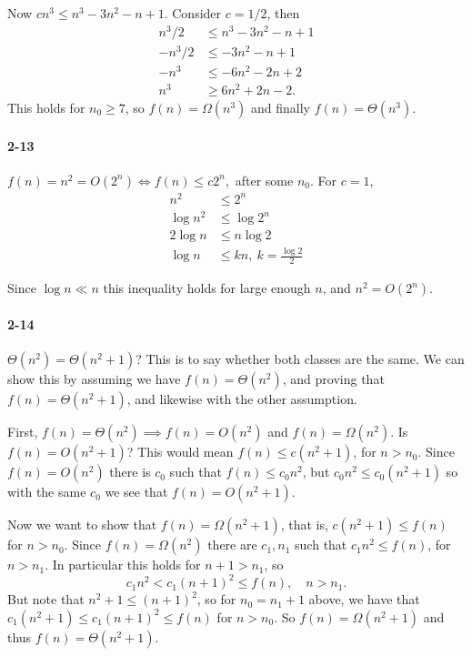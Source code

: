 \documentclass{report}
\begin{document}
Now $cn^3 \le n^3 - 3n^2 - n + 1.$ Consider $c = 1/2$, then
\begin{align*}
	n^3/2 &\le n^3 - 3n^2 - n + 1 \\
	-n^3/2 &\le -3n^2 - n + 1 \\
	-n^3 &\le -6n^2 - 2n + 2 \\
	n^3 &\ge 6n^2 + 2n - 2.
\end{align*}
This holds for $n_0 \ge 7$, so $f(n) = \Omega(n^3)$ and finally $f(n) = \Theta(n^3)$.

\paragraph{2-13}$f(n) = n^2 = O(2^n) \iff f(n) \le c2^n,$ after some $n_0$. For $c = 1$,
\begin{align*}
	n^2 &\le 2^n \\
	\log n^2 &\le \log 2^n \\
	2 \log n &\le n\log 2 \\
	\log n &\le kn,\ k = \frac{\log 2}{2}
\end{align*}

Since $\log n \ll n$ this inequality holds for large enough $n$, and $n^2 = O(2^n)$.

\paragraph{2-14} $\Theta(n^2) = \Theta(n^2+1)$? This is to say whether both classes are the same. We can show this by assuming we have $f(n) = \Theta(n^2)$, and proving that $f(n) = \Theta(n^2+1)$, and likewise with the other assumption.

\smallskip

First, $f(n) = \Theta(n^2) \implies f(n) = O(n^2)$ and $f(n) = \Omega(n^2)$. Is $f(n) = O(n^2+1)$? This would mean $f(n) \le c(n^2+1)$, for $n > n_0$. Since $f(n) = O(n^2)$ there is $c_0$ such that $f(n) \le c_0 n^2$, but $c_0 n^2 \le c_0(n^2 + 1)$ so with the same $c_0$ we see that $f(n) = O(n^2+1)$.

Now we want to show that $f(n) = \Omega(n^2+1)$, that is, $c(n^2 + 1) \le f(n)$ for $n > n_0$. Since $f(n) = \Omega(n^2)$ there are $c_1, n_1$ such that $c_1 n^2 \le f(n)$, for $n > n_1$. In particular this holds for $n+1 > n_1$, so
\[
	c_1 n^2 < c_1 (n+1)^2 \le f(n), \quad n > n_1.
\]
But note that $n^2 + 1 \le (n+1)^2$, so for $n_0 = n_1 + 1$ above, we have that $c_1(n^2 + 1) \le c_1 (n+1)^2 \le f(n)$ for $n > n_0$. So $f(n) = \Omega(n^2+1)$ and thus $f(n) = \Theta(n^2 + 1)$.
\end{document}
